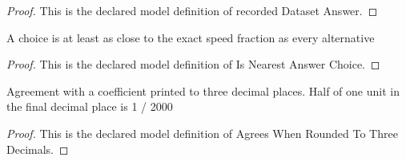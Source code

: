\begin{proof}
  This is the declared model definition of recorded Dataset Answer.
\end{proof}
\begin{definition}
  \label{def:physics:phyx-mini-0513:phyxminiproblems-problemphyxmini0513-isnearestanswerchoice}
  A choice is at least as close to the exact speed fraction as every alternative
\end{definition}
\begin{proof}
  This is the declared model definition of Is Nearest Answer Choice.
\end{proof}
\begin{definition}
  \label{def:physics:phyx-mini-0513:phyxminiproblems-problemphyxmini0513-agreeswhenroundedtothreedecimals}
  Agreement with a coefficient printed to three decimal places. Half of one unit in the final decimal place is 1 / 2000
\end{definition}
\begin{proof}
  This is the declared model definition of Agrees When Rounded To Three Decimals.
\end{proof}
